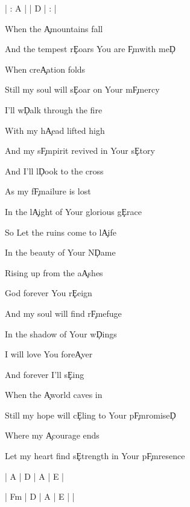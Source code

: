 \documentclass[9pt]{extarticle}
\begin{document}
\bsong

\bi
| : A |  | D | : |
\ei

\bv
When the \c{A}mountains fall

And the tempest r\c{E}oars You are \c{F\s m}with me\c{D}

When cre\c{A}ation folds

Still my soul will s\c{E}oar on Your m\c{F\s m}ercy
\ev

\bp
I'll w\c{D}alk through the fire

With my h\c{A}ead lifted high

And my s\c{F\s m}pirit revived in Your s\c{E}tory



And I'll l\c{D}ook to the cross

As my f\c{F\s m}ailure is lost

In the l\c{A}ight of Your glorious g\c{E}race
\ep

\bc
So Let the ruins come to l\c{A}ife

In the beauty of Your N\c{D}ame

Rising up from the a\c{A}shes

God forever You r\c{E}eign



And my soul will find r\c{F\s m}efuge

In the shadow of Your w\c{D}ings

I will love You fore\c{A}ver

And forever I'll s\c{E}ing
\ec

\bv
When the \c{A}world caves in

Still my hope will c\c{E}ling to Your p\c{F\s m}romise\c{D}

Where my \c{A}courage ends

Let my heart find s\c{E}trength in Your p\c{F\s m}resence
\ev



\bin
| A | D | A | E |

| F\s m | D | A | E |  |
\ein


\esong
\end{document}
